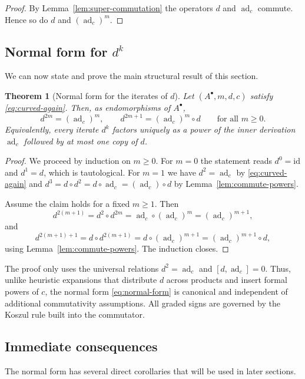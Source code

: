 \documentclass[preprint,12pt]{elsarticle}
\newcommand{\ad}{\operatorname{ad}}
\newtheorem{thm}{Theorem}
\begin{document}
\begin{proof}
By Lemma~\ref{lem:super-commutation} the operators $d$ and $\ad_c$ commute. Hence so do $d$ and $(\ad_c)^m$.
\end{proof}

\subsection{Normal form for $d^k$}
We can now state and prove the main structural result of this section.

\begin{thm}[Normal form for the iterates of $d$]\label{thm:normal-form}
Let $(A^\bullet,m,d,c)$ satisfy \eqref{eq:curved-again}. Then, as endomorphisms of $A^\bullet$,
\begin{equation}\label{eq:normal-form}
d^{2m}=(\ad_c)^m,\qquad d^{2m+1}=(\ad_c)^m\circ d\qquad \text{for all } m\ge 0.
\end{equation}
Equivalently, every iterate $d^k$ factors uniquely as a power of the inner derivation $\ad_c$
followed by at most one copy of $d$.
\end{thm}

\begin{proof}
We proceed by induction on $m\ge 0$. For $m=0$ the statement reads $d^0=\mathrm{id}$ and $d^1=d$, which is tautological.
For $m=1$ we have $d^2=\ad_c$ by \eqref{eq:curved-again} and $d^3=d\circ d^2=d\circ \ad_c=(\ad_c)\circ d$
by Lemma~\ref{lem:commute-powers}.

Assume the claim holds for a fixed $m\ge 1$. Then
\[
d^{2(m+1)}=d^2\circ d^{2m}=\ad_c\circ (\ad_c)^m=(\ad_c)^{m+1},
\]
and
\[
d^{2(m+1)+1}=d\circ d^{2(m+1)}=d\circ (\ad_c)^{m+1}=(\ad_c)^{m+1}\circ d,
\]
using Lemma~\ref{lem:commute-powers}. The induction closes.
\end{proof}

\begin{rmk}\label{rem:no-binomial}
The proof only uses the universal relations $d^2=\ad_c$ and $[d,\ad_c]=0$.
Thus, unlike heuristic expansions that distribute $d$ across products and insert formal powers of $c$,
the normal form \eqref{eq:normal-form} is canonical and independent of additional commutativity assumptions.
All graded signs are governed by the Koszul rule built into the commutator.
\end{rmk}

\subsection{Immediate consequences}
The normal form has several direct corollaries that will be used in later sections.
\end{document}
